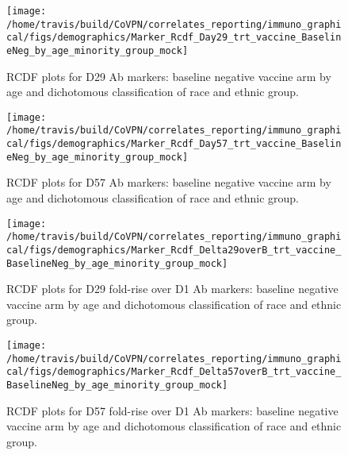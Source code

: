 \documentclass[]{book}
\theoremstyle{definition}
\theoremstyle{definition}
\theoremstyle{definition}
\newcommand{\1}{\mathbbm{1}}
\begin{document}
\clearpage
\begin{figure}[H]

{\centering \texttt{[image: /home/travis/build/CoVPN/correlates\_reporting/immuno\_graphical/figs/demographics/Marker\_Rcdf\_Day29\_trt\_vaccine\_BaselineNeg\_by\_age\_minority\_group\_mock]} 

}

\caption{RCDF plots for D29 Ab markers: baseline negative vaccine arm by age and dichotomous classification of race and ethnic group.}\label{fig:unnamed-chunk-88}
\end{figure}

\clearpage
\begin{figure}[H]

{\centering \texttt{[image: /home/travis/build/CoVPN/correlates\_reporting/immuno\_graphical/figs/demographics/Marker\_Rcdf\_Day57\_trt\_vaccine\_BaselineNeg\_by\_age\_minority\_group\_mock]} 

}

\caption{RCDF plots for D57 Ab markers: baseline negative vaccine arm by age and dichotomous classification of race and ethnic group.}\label{fig:unnamed-chunk-89}
\end{figure}

\clearpage
\begin{figure}[H]

{\centering \texttt{[image: /home/travis/build/CoVPN/correlates\_reporting/immuno\_graphical/figs/demographics/Marker\_Rcdf\_Delta29overB\_trt\_vaccine\_BaselineNeg\_by\_age\_minority\_group\_mock]} 

}

\caption{RCDF plots for D29 fold-rise over D1 Ab markers: baseline negative vaccine arm by age and dichotomous classification of race and ethnic group.}\label{fig:unnamed-chunk-90}
\end{figure}

\clearpage
\begin{figure}[H]

{\centering \texttt{[image: /home/travis/build/CoVPN/correlates\_reporting/immuno\_graphical/figs/demographics/Marker\_Rcdf\_Delta57overB\_trt\_vaccine\_BaselineNeg\_by\_age\_minority\_group\_mock]} 

}

\caption{RCDF plots for D57 fold-rise over D1 Ab markers: baseline negative vaccine arm by age and dichotomous classification of race and ethnic group.}\label{fig:unnamed-chunk-91}
\end{figure}
\end{document}
